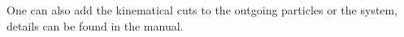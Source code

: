 \documentclass[11pt]{article}
\begin{document}
One can also add the kinematical cuts to the outgoing particles or the system, details can be found in the manual.

%
%
%
%
%
%
%
%
\end{document}
